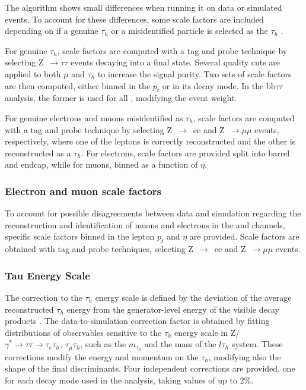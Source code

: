 \documentclass[../main.tex]{subfiles}
\begin{document}
The \deeptau{} algorithm shows small differences when running it on data or simulated events. To account for these differences, some scale factors are included depending on if a genuine $\tau_h$ or a misidentified particle is selected as the $\tau_h$ \cite{tau_performance_2022}. 

For genuine $\tau_h$, scale factors are computed with a tag and probe technique by selecting Z~$\to\tau\tau$ events decaying into a \taumu\tauh{} final state. Several quality cuts are applied to both $\mu$ and $\tau_h$ to increase the signal purity. Two sets of scale factors are then computed, either binned in the \tauh{} $p_t$ or in its decay mode. In the bb$\tau\tau$ analysis, the former is used for all \tauh{}, modifying the event weight.

For genuine electrons and muons misidentified as $\tau_h$, scale factors are computed with a tag and probe technique by selecting Z~$\to$~ee and Z~$\to\mu\mu$ events, respectively, where one of the leptons is correctly reconstructed and the other is reconstructed as a $\tau_h$. For electrons, scale factors are provided split into barrel and endcap, while for muons, binned as a function of $\eta$.

\subsubsection*{Electron and muon scale factors}

To account for possible disagreements between data and simulation regarding the reconstruction and identification of muons and electrons in the \taumu\tauh{} and \taue\tauh{} channels, specific scale factors binned in the lepton $p_t$ and $\eta$ are provided. Scale factors are obtained with tag and probe techniques, selecting Z~$\to$~ee and Z~$\to\mu\mu$ events.

\subsubsection*{Tau Energy Scale}

The correction to the $\tau_h$ energy scale is defined by the deviation of the average reconstructed $\tau_h$ energy from the generator-level energy of the visible \tauh{} decay products \cite{tau_performance_2018, tau_performance_2022}. The data-to-simulation correction factor is obtained by fitting distributions of observables sensitive to the $\tau_h$ energy scale in Z/$\gamma^*\to\tau\tau\to\tau_e\tau_h,~\tau_\mu\tau_h$, such as the $m_{\tau_h}$ and the mass of the $l\tau_h$ system. These corrections modify the energy and momentum on the $\tau_h$, modifying also the shape of the final discriminants. Four independent corrections are provided, one for each decay mode used in the analysis, taking values of up to 2\%. 
\end{document}
